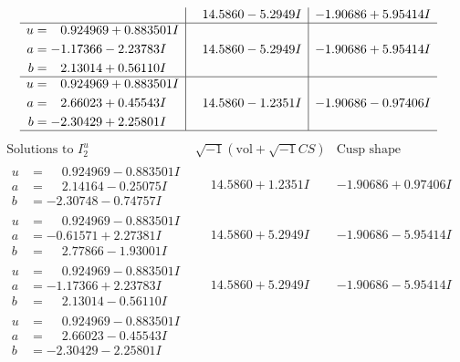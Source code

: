 \documentclass[1p]{elsarticle_modified}
\theoremstyle{definition}
\newcommand{\I}{\sqrt{-1}}
\begin{document}
$$\begin{array}{c|c|c}
 & \phantom{-}14.5860 - 5.2949 I & -1.90686 + 5.95414 I \\ \hline\begin{aligned}
u &= \phantom{-}0.924969 + 0.883501 I \\
a &= -1.17366 - 2.23783 I \\
b &= \phantom{-}2.13014 + 0.56110 I\end{aligned}
 & \phantom{-}14.5860 - 5.2949 I & -1.90686 + 5.95414 I \\ \hline\begin{aligned}
u &= \phantom{-}0.924969 + 0.883501 I \\
a &= \phantom{-}2.66023 + 0.45543 I \\
b &= -2.30429 + 2.25801 I\end{aligned}
 & \phantom{-}14.5860 - 1.2351 I & -1.90686 - 0.97406 I\\
 \hline 
 \end{array}$$\newpage$$\begin{array}{c|c|c}  
\text{Solutions to }I^u_{2}& \I (\text{vol} + \sqrt{-1}CS) & \text{Cusp shape}\\
 \hline 
\begin{aligned}
u &= \phantom{-}0.924969 - 0.883501 I \\
a &= \phantom{-}2.14164 - 0.25075 I \\
b &= -2.30748 - 0.74757 I\end{aligned}
 & \phantom{-}14.5860 + 1.2351 I & -1.90686 + 0.97406 I \\ \hline\begin{aligned}
u &= \phantom{-}0.924969 - 0.883501 I \\
a &= -0.61571 + 2.27381 I \\
b &= \phantom{-}2.77866 - 1.93001 I\end{aligned}
 & \phantom{-}14.5860 + 5.2949 I & -1.90686 - 5.95414 I \\ \hline\begin{aligned}
u &= \phantom{-}0.924969 - 0.883501 I \\
a &= -1.17366 + 2.23783 I \\
b &= \phantom{-}2.13014 - 0.56110 I\end{aligned}
 & \phantom{-}14.5860 + 5.2949 I & -1.90686 - 5.95414 I \\ \hline\begin{aligned}
u &= \phantom{-}0.924969 - 0.883501 I \\
a &= \phantom{-}2.66023 - 0.45543 I \\
b &= -2.30429 - 2.25801 I\end{aligned}

\end{array}$$
\end{document}
